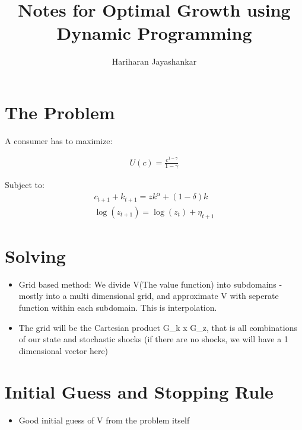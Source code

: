 \documentclass{article}
\title{Notes for Optimal Growth using Dynamic Programming}
\author{Hariharan Jayashankar}
\begin{document}
\maketitle

\section{The Problem}

A consumer has to maximize:

\begin{align}
  U(c) = \frac{c^{1 - \gamma}}{1 - \gamma}
\end{align}

Subject to:
\begin{align}
  c_{t+1} + k_{t+1} = zk^{\alpha} + (1 - \delta)k \\
  \log(z_{t+1}) = \log(z_t) + \eta_{t+1}
\end{align}

\section{Solving}

\begin{itemize}
  \item Grid based method: We divide V(The value function) into subdomains - mostly into a multi dimensional grid, and approximate V with seperate function within each subdomain. This is interpolation.
  \item The grid will be the Cartesian product G\_k x G\_z, that is all combinations of our state and stochastic shocks (if there are no shocks, we will have a 1 dimensional vector here) 
\end{itemize}



\section{Initial Guess and Stopping Rule}

\begin{itemize}
	\item Good initial guess of V from the problem itself
\end{itemize}
\end{document}

